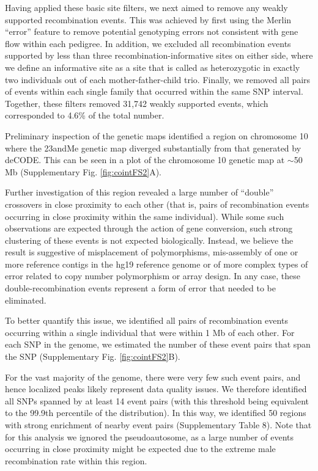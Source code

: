 Having applied these basic site filters, we next aimed to remove any weakly
supported recombination events. This was achieved by first using the Merlin ``error''
feature to remove potential genotyping errors not consistent with gene flow within
each pedigree. In addition, we excluded all recombination events supported by less
than three recombination-informative sites on either side, where we define an
informative site as a site that is called as heterozygotic in exactly two individuals
out of each mother-father-child trio. Finally, we removed all pairs of events within
each single family that occurred within the same SNP interval. Together, these
filters removed 31,742 weakly supported events, which corresponded to 4.6\% of the
total number.

Preliminary inspection of the genetic maps identified a region on chromosome
10 where the 23andMe genetic map diverged substantially from that generated by
deCODE\cite{Kong2010}. This can be seen in a plot of the chromosome 10 genetic map at
$\sim$50 Mb (Supplementary Fig. \ref{fig:cointFS2}A).

Further investigation of this region revealed a large number of ``double''
crossovers in close proximity to each other (that is, pairs of recombination events
occurring in close proximity within the same individual). While some such
observations are expected through the action of gene conversion, such strong
clustering of these events is not expected biologically. Instead, we believe the result
is suggestive of misplacement of polymorphisms, mis-assembly of one or more
reference contigs in the hg19 reference genome or of more complex types of
error related to copy number polymorphism or array design. In any case, these
double-recombination events represent a form of error that needed to be
eliminated.

To better quantify this issue, we identified all pairs of recombination events
occurring within a single individual that were within 1 Mb of each other. For each
SNP in the genome, we estimated the number of these event pairs that span the
SNP (Supplementary Fig. \ref{fig:cointFS2}B).

For the vast majority of the genome, there were very few such event pairs, and
hence localized peaks likely represent data quality issues. We therefore identified all
SNPs spanned by at least 14 event pairs (with this threshold being equivalent 
to the 99.9th percentile of the distribution). In this way, we identified 50 regions
with strong enrichment of nearby event pairs (Supplementary Table 8). Note that
for this analysis we ignored the pseudoautosome, as a large number of events
occurring in close proximity might be expected due to the extreme male
recombination rate within this region.


